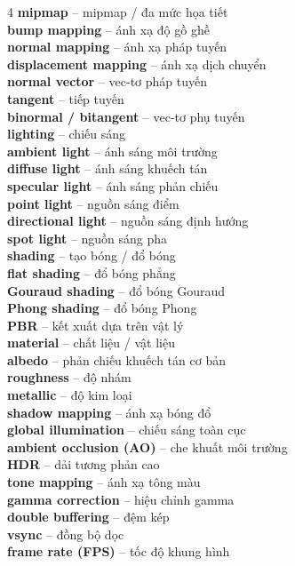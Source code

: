 \begin{multicols}{4}
\textbf{mipmap} -- mipmap / đa mức họa tiết\\
\textbf{bump mapping} -- ánh xạ độ gồ ghề\\
\textbf{normal mapping} -- ánh xạ pháp tuyến\\
\textbf{displacement mapping} -- ánh xạ dịch chuyển\\
\textbf{normal vector} -- vec-tơ pháp tuyến\\
\textbf{tangent} -- tiếp tuyến\\
\textbf{binormal / bitangent} -- vec-tơ phụ tuyến\\
\textbf{lighting} -- chiếu sáng\\
\textbf{ambient light} -- ánh sáng môi trường\\
\textbf{diffuse light} -- ánh sáng khuếch tán\\
\textbf{specular light} -- ánh sáng phản chiếu\\
\textbf{point light} -- nguồn sáng điểm\\
\textbf{directional light} -- nguồn sáng định hướng\\
\textbf{spot light} -- nguồn sáng pha\\
\textbf{shading} -- tạo bóng / đổ bóng\\
\textbf{flat shading} -- đổ bóng phẳng\\
\textbf{Gouraud shading} -- đổ bóng Gouraud\\
\textbf{Phong shading} -- đổ bóng Phong\\
\textbf{PBR} -- kết xuất dựa trên vật lý\\
\textbf{material} -- chất liệu / vật liệu\\
\textbf{albedo} -- phản chiếu khuếch tán cơ bản\\
\textbf{roughness} -- độ nhám\\
\textbf{metallic} -- độ kim loại\\
\textbf{shadow mapping} -- ánh xạ bóng đổ\\
\textbf{global illumination} -- chiếu sáng toàn cục\\
\textbf{ambient occlusion (AO)} -- che khuất môi trường\\
\textbf{HDR} -- dải tương phản cao\\
\textbf{tone mapping} -- ánh xạ tông màu\\
\textbf{gamma correction} -- hiệu chỉnh gamma\\
\textbf{double buffering} -- đệm kép\\
\textbf{vsync} -- đồng bộ dọc\\
\textbf{frame rate (FPS)} -- tốc độ khung hình\\


\end{multicols}
